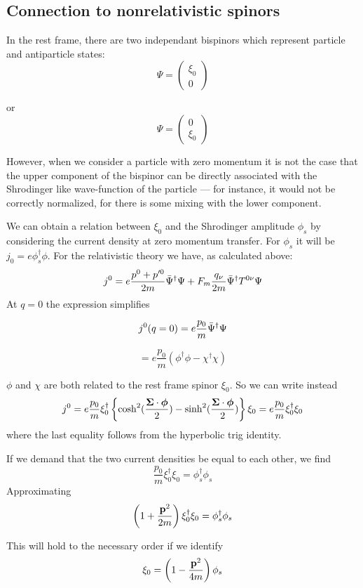 \subsection{Connection to nonrelativistic spinors}


In the rest frame, there are two independant bispinors which represent particle and antiparticle states: 
\[
	\Psi = \begin{pmatrix} \xi_0 \\ 0 \end{pmatrix}
\]

or
\[
	\Psi = \begin{pmatrix} 0 \\ \xi_0 \end{pmatrix}
\]

However, when we consider a particle with zero momentum it is not the case that the upper component of the bispinor can be directly associated with the Shrodinger like wave-function of the particle --- for instance, it would not be correctly normalized, for there is some mixing with the lower component.

We can obtain a relation between $\xi_0$ and the Shrodinger amplitude $\phi_s$ by considering the current density at zero momentum transfer.  For $\phi_s$ it will be $j_0 = e \phi_s^\dagger \phi$.  For the relativistic theory we have, as calculated above:
\[
	j^0 = e \frac{p^0 + p'^0}{2m} \bar{\Psi}^\dagger \Psi + F_m 	\frac{q_\nu}{2m} \bar{\Psi}^\dagger T^{0\nu} \Psi	
\]
At $q=0$ the expression simplifies

\[
	j^0(q=0) = e \frac{p_0}{m} \bar{\Psi}^\dagger \Psi
\]

\[
	= e  \frac{p_0}{m}( \phi^\dagger \phi - \chi^\dagger \chi )
\]

$\phi$ and $\chi$ are both related to the rest frame spinor $\xi_0$.  So we can write instead
\[
	j^0 = e \frac{p_0}{m} \xi_0^\dagger \left \{ 
		\cosh^2( \frac{\mbox{\boldmath$ \Sigma $} \cdot \mbox{\boldmath$ \phi $} }{2})
		- \sinh^2( \frac{\mbox{\boldmath$ \Sigma $} \cdot \mbox{\boldmath$ \phi $} }{2})
	\right \} \xi_0  
		=	e \frac{p_0}{m} \xi_0^\dagger \xi_0
\]
where the last equality follows from the hyperbolic trig identity.

If we demand that the two current densities be equal to each other, we find
\[
	\frac{p_0}{m} \xi_0^\dagger \xi_0 = \phi_s^\dagger \phi_s
\]
Approximating
\[
	\left( 1 + \frac{\mathbf{p}^2}{2m} \right) \xi_0^\dagger \xi_0 = \phi_s^\dagger \phi_s
\]

This will hold to the necessary order if we identify
\[
	\xi_0 = \left( 1 - \frac{\mathbf{p}^2}{4m} \right) \phi_s
\]

